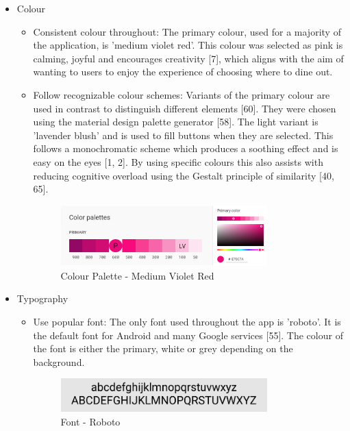 \documentclass[a4 paper, 12pt]{article}
\begin{document}
        \begin{itemize}
            \item Colour
                \begin{itemize}
                    \item Consistent colour throughout: The primary colour, used for a majority of the application, is 'medium violet red'. This colour was selected as pink is calming, joyful and encourages creativity [7], which aligns with the aim of wanting to users to enjoy the experience of choosing where to dine out.
                    \item Follow recognizable colour schemes: Variants of the primary colour are used in contrast to distinguish different elements [60]. They were chosen using the material design palette generator [58]. The light variant is 'lavender blush' and is used to fill buttons when they are selected. This follows a monochromatic scheme which produces a soothing effect and is easy on the eyes [1, 2]. By using specific colours this also assists with reducing cognitive overload using the Gestalt principle of similarity [40, 65].   
                    \begin{figure} [H]
                        \centering
                        \includegraphics[width=0.8\textwidth, frame]
                            {./Med_Fidelity/Med_Report/images/colour_med.PNG}
                        \caption{Colour Palette - Medium Violet Red}
                    \end{figure}
                \end{itemize}

            \item Typography
                \begin{itemize}
                    \item Use popular font: The only font used throughout the app is 'roboto'. It is the default font for Android and many Google services [55]. The colour of the font is either the primary, white or grey depending on the background.
                    \begin{figure} [H]
                        \centering
                        \includegraphics[width=0.8\textwidth, frame]
                            {./Med_Fidelity/Med_Report/images/font.PNG}
                        \caption{Font - Roboto}
                    \end{figure}                    
                \end{itemize}


\end{itemize}
\end{document}
